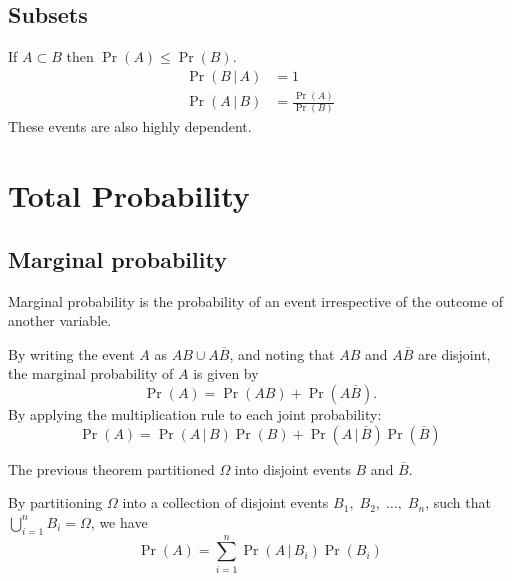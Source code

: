 \documentclass{article}
\begin{document}
\begin{multicols}{3}
    \subsection{Subsets}
    If \(A \subset B\) then \(\Pr{\left( A \right)} \leq \Pr{\left( B \right)}\).
    \begin{align*}
        \Pr{\left( B \,\vert\, A \right)} & = 1                                                   \\
        \Pr{\left( A \,\vert\, B \right)} & = \frac{\Pr{\left( A \right)}}{\Pr{\left( B \right)}}
    \end{align*}
    These events are also highly dependent.
    \section{Total Probability}
    \subsection{Marginal probability}
    Marginal probability is the probability of an event \linebreak irrespective of the outcome of another variable.
    \begin{theorem}
        By writing the event \(A\) as \(AB \cup A\overline{B}\), and noting that \(AB\) and \(A\overline{B}\) are disjoint,
        the marginal probability of \(A\) is given by
        \begin{equation*}
            \Pr{\left( A \right)} = \Pr{\left( AB \right)} + \Pr{\left( A\overline{B} \right)}.
        \end{equation*}
        By applying the multiplication rule to each joint probability:
        \begin{equation*}
            \Pr{\left( A \right)} = \Pr{\left( A \,\vert\, B \right)}\Pr{\left( B \right)} + \Pr{\left( A \,\vert\, \overline{B} \right)}\Pr{\left( \overline{B} \right)}
        \end{equation*}
    \end{theorem}
    \begin{theorem}
        The previous theorem partitioned \(\Omega\) into disjoint events \(B\) and \(\overline{B}\).

        By partitioning \(\Omega\) into a collection of disjoint events \(B_1,\; B_2,\; \dots,\; B_n\),
        such that \(\bigcup_{i=1}^n B_i = \Omega\), we have
        \begin{equation*}
            \Pr{\left( A \right)} = \sum_{i = 1}^n \Pr{\left( A \,\vert\, B_i \right)}\Pr{\left( B_i \right)}
        \end{equation*}
    \end{theorem}

\end{multicols}
\end{document}
